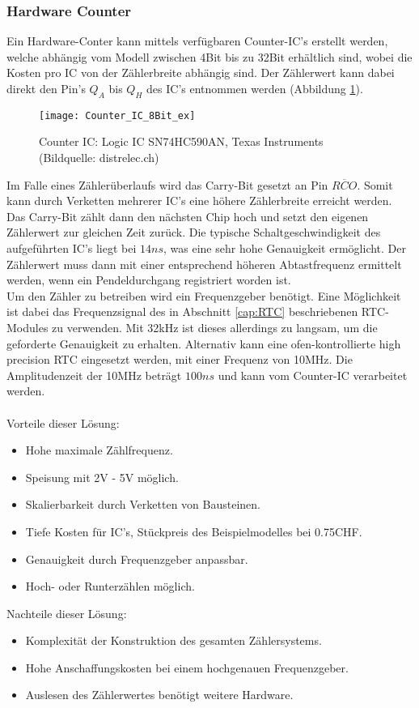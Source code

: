 	\subsubsection{Hardware Counter}
		Ein Hardware-Conter kann mittels verfügbaren Counter-IC's erstellt werden, welche abhängig vom Modell zwischen 4Bit bis zu 32Bit erhältlich sind, wobei die Kosten pro IC von der Zählerbreite abhängig sind. Der Zählerwert kann dabei direkt den Pin's $Q_A$ bis $Q_H$ des IC's entnommen werden (Abbildung \ref{fig:SN74HC590AN}).
		\begin{figure}[H]
        	\centering
        	\texttt{[image: Counter\_IC\_8Bit\_ex]}
        	\caption{Counter IC: Logic IC SN74HC590AN, Texas Instruments (Bildquelle: distrelec.ch)}
        	\label{fig:SN74HC590AN}
    	\end{figure}
\noindent Im Falle eines Zählerüberlaufs wird das Carry-Bit gesetzt an Pin $\overline{RCO}$. Somit kann durch Verketten mehrerer IC's eine höhere Zählerbreite erreicht werden. Das Carry-Bit zählt dann den nächsten Chip hoch und setzt den eigenen Zählerwert zur gleichen Zeit zurück. Die typische Schaltgeschwindigkeit des aufgeführten IC's liegt bei $14ns$, was eine sehr hohe Genauigkeit ermöglicht. Der Zählerwert muss dann mit einer entsprechend höheren Abtastfrequenz ermittelt werden, wenn ein Pendeldurchgang registriert worden ist.\\
Um den Zähler zu betreiben wird ein Frequenzgeber benötigt. Eine Möglichkeit ist dabei das Frequenzsignal des in Abschnitt \ref{cap:RTC} beschriebenen RTC-Modules zu verwenden. Mit 32kHz ist dieses allerdings zu langsam, um die geforderte Genauigkeit zu erhalten. Alternativ kann eine ofen-kontrollierte high precision RTC eingesetzt werden, mit einer Frequenz von 10MHz. Die Amplitudenzeit der 10MHz beträgt $100ns$ und kann vom Counter-IC verarbeitet werden.\\
\\
Vorteile dieser Lösung:
    \begin{itemize}
    	\item Hohe maximale Zählfrequenz.
    	\item Speisung mit 2V - 5V möglich.
    	\item Skalierbarkeit durch Verketten von Bausteinen.
    	\item Tiefe Kosten für IC's, Stückpreis des Beispielmodelles bei 0.75CHF.
    	\item Genauigkeit durch Frequenzgeber anpassbar.
    	\item Hoch- oder Runterzählen möglich.
    \end{itemize}
    Nachteile dieser Lösung:
    \begin{itemize}
    	\item Komplexität der Konstruktion des gesamten Zählersystems.
    	\item Hohe Anschaffungskosten bei einem hochgenauen Frequenzgeber.
    	\item Auslesen des Zählerwertes benötigt weitere Hardware.
    \end{itemize}

